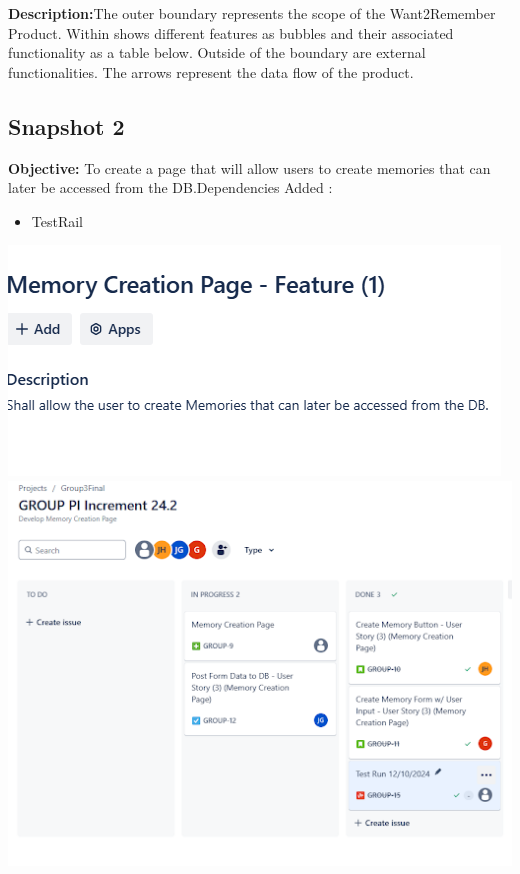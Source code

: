 \documentclass{article}
\begin{document}
\textbf{Description:}The outer boundary represents the scope of the Want2Remember Product. Within shows different features as bubbles and their associated functionality as a table below. Outside of the boundary are external functionalities. The arrows represent the data flow of the product.


\subsection{Snapshot 2}
\textbf{Objective:} To create a page that will allow users to create memories that can later be accessed from the DB.\newline Dependencies Added :
\begin{itemize}
    \item
     TestRail
\end{itemize}
\includegraphics{snapshot2img1.png}
\includegraphics{snapshot2img2.png}
\end{document}
